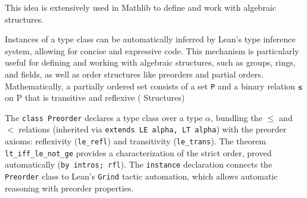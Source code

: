 


This idea is extensively used in Mathlib to define and work with algebraic structures.

Instances of a type class can be automatically inferred by Lean's type inference system,
allowing for concise and expressive code.
This mechanism is particularly useful for defining and working with algebraic structures,
such as groups, rings, and fields, as well as order structures like preorders and partial orders.
Mathematically, a partially ordered set consists of a set \lstinline[language=lean]|P| 
and a binary relation 
\lstinline[language=lean]|≤| 
on P that is transitive and reflexive (\cite{mathinlean} Structures)



  The \texttt{class Preorder} declares a type class over a type 
 \(\alpha\), bundling the \(\leq\) and \(<\) relations 
 (inherited via \texttt{extends LE alpha, LT alpha}) with the
  preorder axioms: reflexivity (\texttt{le\_refl}) and 
  transitivity (\texttt{le\_trans}).
  The theorem \texttt{lt\_iff\_le\_not\_ge} provides a characterization of the strict order, 
  proved automatically (\texttt{by intros; rfl}).
  The \texttt{instance} declaration connects the \texttt{Preorder} class to Lean’s \texttt{Grind} 
  tactic automation, which allows automatic reasoning with preorder properties.

